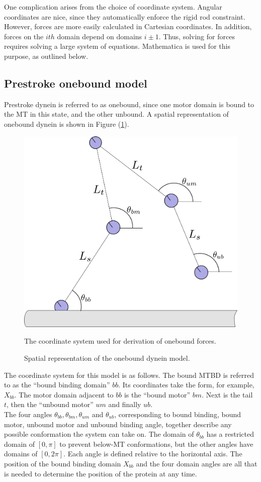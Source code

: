 \documentclass[
11pt, %
english, %
singlespacing, %
headsepline, %
chapterinoneline, %
]{MastersDoctoralThesis} %
\begin{document}
One complication arises from the choice of coordinate system. Angular coordinates are nice, since they automatically enforce the rigid rod constraint. However, forces are more easily calculated in Cartesian coordinates. In addition, forces on the $ith$ domain depend on domains $i\pm1$. Thus, solving for forces requires solving a large system of equations. Mathematica is used for this purpose, as outlined below.\\

\subsection{Prestroke onebound model}
Prestroke dynein is referred to as onebound, since one motor domain is bound to the MT in this state, and the other unbound. A spatial representation of onebound dynein is shown in Figure (\ref{fig:derivation-onebound}).

\begin{figure}[h]
  \centering
  \includegraphics[width=.45\textwidth]{../figures/derivation-onebound}
  \caption{Spatial representation of the onebound dynein model.}{The coordinate system used for derivation of onebound forces.}
  \label{fig:derivation-onebound}
\end{figure}

The coordinate system for this model is as follows. The bound MTBD is referred to as the ``bound binding domain'' $bb$. Its coordinates take the form, for example, $X_{bb}$. The motor domain adjacent to $bb$ is the ``bound motor'' $bm$. Next is the tail $t$, then the ``unbound motor'' $um$ and finally $ub$.\\

The four angles $\theta_{bb}, \theta_{bm}, \theta_{um}$ and $\theta_{ub}$, corresponding to bound binding, bound motor, unbound motor and unbound binding angle, together describe any possible conformation the system can take on. The domain of $\theta_{bb}$ has a restricted domain of $[0,\pi]$ to prevent below-MT conformations, but the other angles have domains of $[0,2\pi]$. Each angle is defined relative to the horizontal axis. The position of the bound binding domain $X_{bb}$ and the four domain angles are all that is needed to determine the position of the protein at any time.\\
\end{document}
